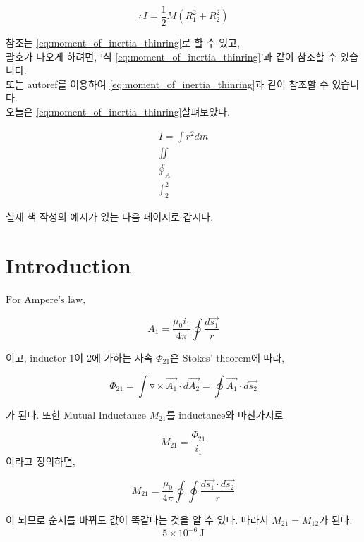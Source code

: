 \documentclass{article} %
\begin{document}
\begin{equation}
    \therefore I =\frac{1}{2} M \left( R_{1}^{2}+R_{2}^{2} \right)
    \label{eq:moment_of_inertia_thinring} %
\end{equation}

참조는 \ref{eq:moment_of_inertia_thinring}로 할 수 있고, \\
괄호가 나오게 하려면, `식 \eqref{eq:moment_of_inertia_thinring}'과 같이 참조할 수 있습니다. \\
또는 autoref를 이용하여 \autoref{eq:moment_of_inertia_thinring}과 같이 참조할 수 있습니다. \\

오늘은 \autoref{eq:moment_of_inertia_thinring}\을 살펴보았다.

\begin{align}
    I=\int r^2 dm \\
    \iint \\
    \oint_{A} \\
    \int^{2}_{2}
\end{align}





\vspace{2em}

\begin{center}
실제 책 작성의 예시가 있는 다음 페이지로 갑시다.
\end{center}

\newpage

\section{Introduction}
$\textrm{For Ampere's law,}$

\begin{equation}
    A_1 = \frac{\mu_0 i_1}{4 \pi} \oint { \frac{d\vec{s_1}}{r} }
\end{equation}

이고, inductor 1이 2에 가하는 자속 $ \Phi_{21}$은 Stokes' theorem에 따라,

\begin{equation}
    \Phi_{21} = \int \triangledown \times \vec{A_1} \cdot d\vec{A_2} = \oint \vec{A_1} \cdot d\vec{s_2}
\end{equation}

가 된다. 또한 Mutual Inductance $M_{21}$를 inductance와 마찬가지로

\begin{equation*}
    M_{21} = \frac{\Phi_{21}}{i_1}
\end{equation*}
이라고 정의하면,

\begin{equation}
    M_{21} = \frac{\mu_0}{4\pi} \oint \oint \frac{d\vec{s_1} \cdot d\vec{s_2}}{r}
\end{equation}

이 되므로 순서를 바꿔도 값이 똑같다는 것을 알 수 있다.
따라서 $ M_{21} = M_{12} $가 된다. \\

\begin{equation}
    5 \times 10^{-6}\,\mathrm{J}
\end{equation}
\end{document}
